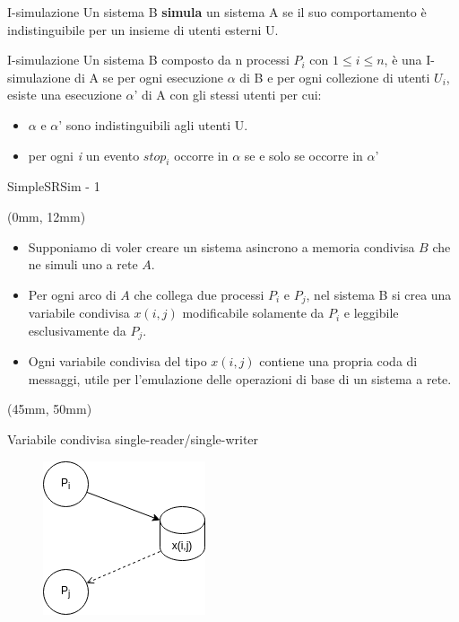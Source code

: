 \documentclass{beamer}
\begin{document}
\begin{frame}{I-simulazione}
    Un sistema B \textbf{simula} un sistema A se il suo comportamento è indistinguibile per un insieme di utenti esterni U.
    
    \begin{block}{I-simulazione}
        Un sistema B composto da n processi $P_{i}$ con $1 \leq i \leq n$, è una I-simulazione di A se per ogni esecuzione $\alpha$ di B e per ogni collezione di utenti $U_{i}$, esiste una esecuzione $\alpha$' di A con gli stessi utenti per cui:
        \begin{itemize}
            \item $\alpha$ e $\alpha$' sono indistinguibili agli utenti U. %
            \item per ogni \textit{i} un evento $stop_{i}$ occorre in $\alpha$ se e solo se occorre in $\alpha$'
        \end{itemize}
    \end{block}
    
\end{frame}

\begin{frame}{SimpleSRSim - 1}
\begin{textblock*}{\textwidth}(0mm, 12mm)
    \begin{itemize}
        \item Supponiamo di voler creare un sistema asincrono a memoria condivisa $B$ che ne simuli uno a rete $A$.
        \item Per ogni arco di $A$ che collega due processi $P_i$ e $P_j$, nel sistema B si crea una variabile condivisa $x(i, j)$ modificabile solamente da $P_i$ e leggibile esclusivamente da $P_j$.%
        \item Ogni variabile condivisa del tipo $x(i,j)$ contiene una propria coda di messaggi, utile per l’emulazione delle operazioni di base di un sistema a rete.
    \end{itemize}
\end{textblock*}
\begin{textblock*}{0.65\textwidth}(45mm, 50mm)
    \begin{block}{Variabile condivisa single-reader/single-writer}
    \begin{figure}
        \centering
        \includegraphics[scale=0.4]{struttura_di_base.png}
    \end{figure}
    \end{block}
\end{textblock*}
\end{frame}
\end{document}
